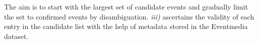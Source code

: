 \documentclass[10pt,a4paper]{article}
\begin{document}
The aim is to start with the largest set of candidate events and gradually limit the set to confirmed events by disambiguation. 
\textit{iii)} ascertains the validity of each entry in the candidate list with the help of metadata stored in the Eventmedia dataset. 
\end{document}
